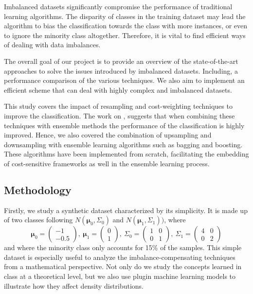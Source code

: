 \documentclass[conference]{IEEEtran}
\begin{document}
	Imbalanced datasets significantly compromise the performance of traditional learning algorithms. The disparity of classes in the training dataset may lead the algorithm to bias the classification towards the class with more instances, or even to ignore the minority class altogether. Therefore, it is vital to find efficient ways of dealing with data imbalances.

	The overall goal of our project is to provide an overview of the state-of-the-art approaches to solve the issues introduced by imbalanced datasets. Including, a performance comparison of the various techniques. We also aim to implement an efficient scheme that can deal with highly complex and imbalanced datasets.

This study covers the impact of resampling and cost-weighting techniques to improve the classification. The work on \cite{ensembles_review}, suggests that when combining these techniques with ensemble methods the performance of the classification is highly improved. Hence, we also covered the combination of upsampling and downsampling with ensemble learning algorithms such as bagging and boosting. These algorithms have been implemented from scratch, facilitating the embedding of cost-sensitive frameworks as well in the ensemble learning process.

	\subsection{Methodology}
	Firstly, we study a synthetic dataset characterized by its simplicity. It is made up of two classes following $N(\boldsymbol\mu_0, \Sigma_0)$ and $N(\boldsymbol\mu_1, \Sigma_1))$, where
			\begin{equation*}
				\boldsymbol\mu_0=
				\begin{pmatrix}
					-1\\
					-0.5
				\end{pmatrix},\ %
				\boldsymbol\mu_1=
				\begin{pmatrix}
					0\\
					1
				\end{pmatrix},\ %
				\Sigma_0=
				\begin{pmatrix}
					1 & 0\\
					0 & 1
				\end{pmatrix},\ %
				\Sigma_1=
				\begin{pmatrix}
					4 & 0\\
					0 & 2
				\end{pmatrix}
			\end{equation*} and where the minority class only accounts for 15\% of the samples. This simple dataset is especially useful to analyze the imbalance-compensating techniques from a mathematical perspective. Not only do we study the concepts learned in class at a theoretical level, but we also use plugin machine learning models to illustrate how they affect density distributions.
\end{document}
